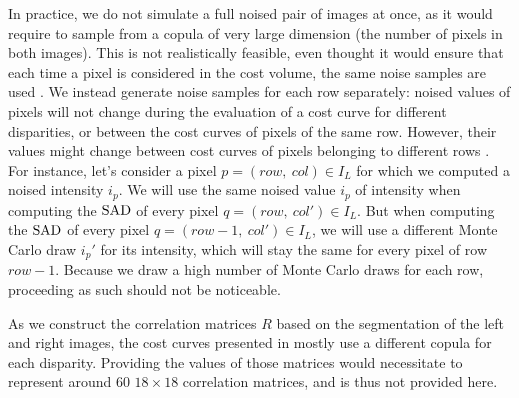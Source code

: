 In practice, we do not simulate a full noised pair of images at once, as it would require to sample from a copula of very large dimension (the number of pixels in both images). This is not realistically feasible, even thought  it would ensure that each time a pixel is considered in the cost volume, the same noise samples are used . We instead generate noise samples for each row separately: noised values of pixels will not change during the evaluation of a cost curve for different disparities, or between the cost curves of pixels of the same row. However, their values might change between cost curves of pixels belonging to different rows . For instance, let's consider a pixel $p=(row,~col)\in I_L$ for which we computed a noised intensity $i_p$. We will use the same noised value $i_p$ of intensity when computing the $\mathrm{SAD}$ of every pixel $q=(row,~col')\in I_L$. But when computing the $\mathrm{SAD}$ of every pixel $q=(row-1,~col')\in I_L$, we will use a different Monte Carlo draw $i_p'$ for its intensity, which will stay the same for every pixel of row $row-1$. Because we draw a high number of Monte Carlo draws for each row, proceeding as such should not be noticeable. 

\begin{remark}
    As we construct the correlation matrices $R$ based on the segmentation of the left and right images, the cost curves presented in  mostly use a different copula for each disparity. Providing the values of those matrices would necessitate to represent around $60$ $18\times18$ correlation matrices, and is thus not provided here.
\end{remark}

